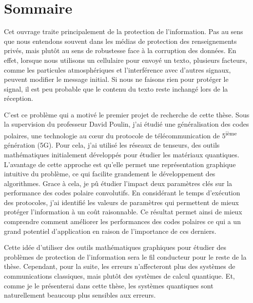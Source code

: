 \begin{comment}
\end{comment}

\clearpage  %
\chapter*{Sommaire}

Cet ouvrage traite principalement de la protection de l'information. Pas au
sens que nous entendons souvent dans les médias de protection des renseignements privés, 
mais plutôt au sens de robustesse face à la corruption des données.
En effet, lorsque nous utilisons un cellulaire pour envoyé un texto, plusieurs
facteurs, comme les particules atmosphériques et l'interférence avec d'autres
signaux, peuvent modifier le message initial. Si nous ne faisons rien pour protéger le signal, 
il est peu probable que le contenu du texto reste inchangé lors de la réception.

C'est ce problème qui a motivé le premier projet de recherche de cette thèse.
Sous la supervision du professeur David Poulin, 
j'ai étudié une généralisation des codes polaires,
une technologie au cœur du protocole de télécommunication de 5\textsuperscript{ième} génération (5G). 
Pour cela, j'ai utilisé les réseaux de tenseurs, des outils
mathématiques initialement développés pour étudier les matériaux quantiques.
L'avantage de cette approche est qu'elle permet une représentation graphique
intuitive du problème, ce qui facilite grandement le développement des algorithmes.
Grace à cela,
je pû étudier l'impact deux paramètres clés sur la performance des 
codes polaire convolutifs.
En considérant le temps d'exécution des protocoles,
j'ai identifié les valeurs de paramètres qui permettent de mieux protéger 
l'information à un coût raisonnable.
Ce résultat permet ainsi de mieux comprendre comment améliorer les performances
des codes polaires ce qui a un grand potentiel d'application en raison
de l'importance de ces derniers.

Cette idée d'utiliser des outils mathématiques graphiques pour étudier des
problèmes de protection de l'information sera le fil conducteur pour le reste de
la thèse. Cependant, pour la suite, les erreurs n'affecteront plus des systèmes
de communications classiques, mais plutôt des systèmes de calcul quantique.
Et, comme je le présenterai dans cette thèse, les systèmes quantiques sont
naturellement beaucoup plus sensibles aux erreurs.

